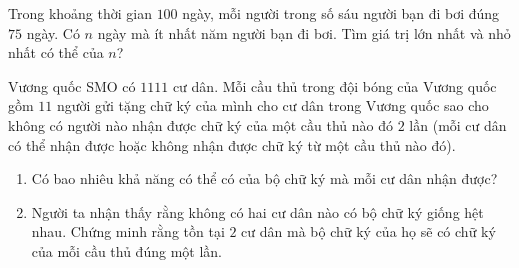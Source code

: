 \begin{ex}%
Trong khoảng thời gian $100$ ngày, mỗi người trong số sáu người bạn đi bơi đúng $75$ ngày. Có $n$ ngày mà ít nhất năm người bạn đi bơi. Tìm giá trị lớn nhất và nhỏ nhất có thể của $n$?
\end{ex}

\begin{ex}%
	Vương quốc SMO có $1111$ cư dân. Mỗi cầu thủ trong đội bóng của Vương quốc gồm $11$ người gửi tặng chữ ký của mình cho cư dân trong Vương quốc sao cho không có người nào nhận được chữ ký của một cầu thủ nào đó $2$ lần (mỗi cư dân có thể nhận được hoặc không nhận được chữ ký từ một cầu thủ nào đó).
	\begin{enumerate}
		\item Có bao nhiêu khả năng có thể có của bộ chữ ký mà mỗi cư dân nhận được?
		\item Người ta nhận thấy rằng không có hai cư dân nào có bộ chữ ký giống hệt nhau. Chứng minh rằng tồn tại $2$ cư dân mà bộ chữ ký của họ sẽ có chữ ký của mỗi cầu thủ đúng một lần.
	\end{enumerate}
\end{ex}

